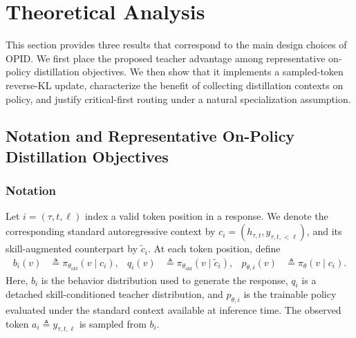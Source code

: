 
\section{Theoretical Analysis}
\label{app:theory}

This section provides three results that correspond to the main design choices of
OPID. We first place the proposed teacher advantage among representative
on-policy distillation objectives. We then show that it implements a sampled-token
reverse-KL update, characterize the benefit of collecting distillation contexts
on policy, and justify critical-first routing under a natural specialization
assumption.
\subsection{Notation and Representative On-Policy Distillation Objectives}
\label{app:theory_setup}

\subsubsection{Notation}

Let \(i=(\tau,t,\ell)\) index a valid token position in a response. We denote
the corresponding standard autoregressive context by
\(c_i=(h_{\tau,t},y_{\tau,t,<\ell})\), and its skill-augmented counterpart by
\(\widetilde c_i\). At each token position, define
\begin{equation*}
\begin{aligned}
 b_i(v) &\triangleq \pi_{\theta_{\mathrm{old}}}(v\mid c_i),
 & q_i(v) &\triangleq \pi_{\theta_{\mathrm{old}}}(v\mid \widetilde c_i),
 & p_{\theta,i}(v) &\triangleq \pi_{\theta}(v\mid c_i).
\end{aligned}
\end{equation*}
Here, \(b_i\) is the behavior distribution used to generate the response,
\(q_i\) is a detached skill-conditioned teacher distribution, and
\(p_{\theta,i}\) is the trainable policy evaluated under the standard context
available at inference time. The observed token
\(a_i\triangleq y_{\tau,t,\ell}\) is sampled from \(b_i\).

